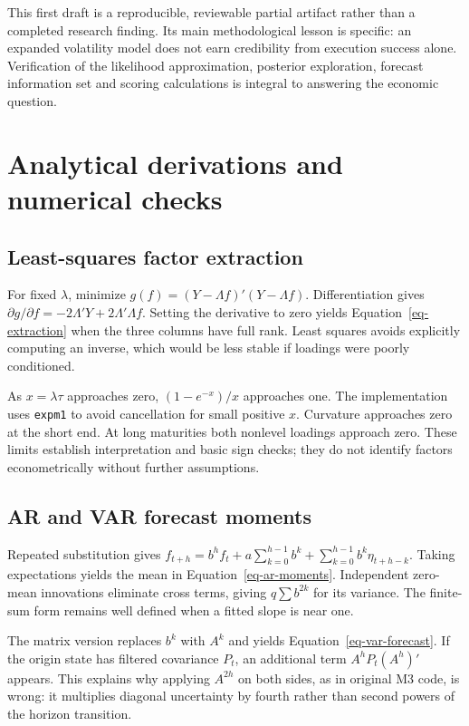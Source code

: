 \documentclass[
  12pt,
  letterpaper,
  DIV=11,
  numbers=noendperiod]{scrreprt}
\begin{document}
This first draft is a reproducible, reviewable partial artifact rather
than a completed research finding. Its main methodological lesson is
specific: an expanded volatility model does not earn credibility from
execution success alone. Verification of the likelihood approximation,
posterior exploration, forecast information set and scoring calculations
is integral to answering the economic question.

\chapter{Analytical derivations and numerical
checks}\label{sec-appendix}

\section{Least-squares factor
extraction}\label{least-squares-factor-extraction}

For fixed \(\lambda\), minimize \(g(f)=(Y-\Lambda f)'(Y-\Lambda f)\).
Differentiation gives
\(\partial g/\partial f=-2\Lambda'Y+2\Lambda'\Lambda f\). Setting the
derivative to zero yields Equation~\ref{eq-extraction} when the three
columns have full rank. Least squares avoids explicitly computing an
inverse, which would be less stable if loadings were poorly conditioned.

As \(x=\lambda\tau\) approaches zero, \((1-e^{-x})/x\) approaches one.
The implementation uses \texttt{expm1} to avoid cancellation for small
positive \(x\). Curvature approaches zero at the short end. At long
maturities both nonlevel loadings approach zero. These limits establish
interpretation and basic sign checks; they do not identify factors
econometrically without further assumptions.

\section{AR and VAR forecast moments}\label{ar-and-var-forecast-moments}

Repeated substitution gives
\(f_{t+h}=b^hf_t+a\sum_{k=0}^{h-1}b^k+\sum_{k=0}^{h-1}b^k\eta_{t+h-k}\).
Taking expectations yields the mean in Equation~\ref{eq-ar-moments}.
Independent zero-mean innovations eliminate cross terms, giving
\(q\sum b^{2k}\) for its variance. The finite-sum form remains well
defined when a fitted slope is near one.

The matrix version replaces \(b^k\) with \(A^k\) and yields
Equation~\ref{eq-var-forecast}. If the origin state has filtered
covariance \(P_t\), an additional term \(A^hP_t(A^h)'\) appears. This
explains why applying \(A^{2h}\) on both sides, as in original M3 code,
is wrong: it multiplies diagonal uncertainty by fourth rather than
second powers of the horizon transition.
\end{document}
